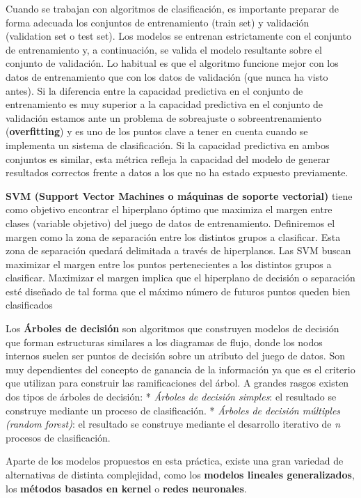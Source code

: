 \documentclass[]{article}
\begin{document}
Cuando se trabajan con algoritmos de clasificación, es importante
preparar de forma adecuada los conjuntos de entrenamiento (train set) y
validación (validation set o test set). Los modelos se entrenan
estrictamente con el conjunto de entrenamiento y, a continuación, se
valida el modelo resultante sobre el conjunto de validación. Lo habitual
es que el algoritmo funcione mejor con los datos de entrenamiento que
con los datos de validación (que nunca ha visto antes). Si la diferencia
entre la capacidad predictiva en el conjunto de entrenamiento es muy
superior a la capacidad predictiva en el conjunto de validación estamos
ante un problema de sobreajuste o sobreentrenamiento
(\textbf{overfitting}) y es uno de los puntos clave a tener en cuenta
cuando se implementa un sistema de clasificación. Si la capacidad
predictiva en ambos conjuntos es similar, esta métrica refleja la
capacidad del modelo de generar resultados correctos frente a datos a
los que no ha estado expuesto previamente.

\textbf{SVM (Support Vector Machines o máquinas de soporte vectorial)}
tiene como objetivo encontrar el hiperplano óptimo que maximiza el
margen entre clases (variable objetivo) del juego de datos de
entrenamiento. Definiremos el margen como la zona de separación entre
los distintos grupos a clasificar. Esta zona de separación quedará
delimitada a través de hiperplanos. Las SVM buscan maximizar el margen
entre los puntos pertenecientes a los distintos grupos a clasificar.
Maximizar el margen implica que el hiperplano de decisión o separación
esté diseñado de tal forma que el máximo número de futuros puntos queden
bien clasificados

Los \textbf{Árboles de decisión} son algoritmos que construyen modelos
de decisión que forman estructuras similares a los diagramas de flujo,
donde los nodos internos suelen ser puntos de decisión sobre un atributo
del juego de datos. Son muy dependientes del concepto de ganancia de la
información ya que es el criterio que utilizan para construir las
ramificaciones del árbol. A grandes rasgos existen dos tipos de árboles
de decisión: * \emph{Árboles de decisión simples}: el resultado se
construye mediante un proceso de clasificación. * \emph{Árboles de
decisión múltiples (random forest)}: el resultado se construye mediante
el desarrollo iterativo de \emph{n} procesos de clasificación.

Aparte de los modelos propuestos en esta práctica, existe una gran
variedad de alternativas de distinta complejidad, como los
\textbf{modelos lineales generalizados}, los \textbf{métodos basados en
kernel} o \textbf{redes neuronales}.
\end{document}
